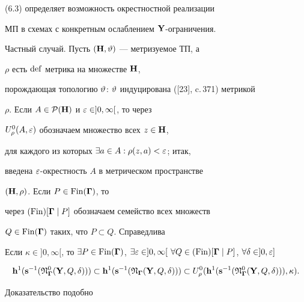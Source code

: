 (6.3) определяет возможность окрестностной реализации


МП в схемах с конкретным ослаблением ${\bold Y}$-ограничения.


\medskip





Частный случай. Пусть $({\bold H},\vartheta)$ --- метризуемое ТП, а


$\rho$ есть $\operatorname{def}$ метрика на множестве ${\bold H}$,


порождающая топологию $\vartheta$: $\vartheta$ индуцирована ([23], c.\,371) метрикой


$\rho$. Если $A \in {{\cal P}({\bold H})}$ и $\varepsilon \in ]0,\infty[$, то через


${U_\rho^0}(A,\varepsilon)$ обозначаем множество всех $z \in {\bold H}$,


для каждого из которых $\exists{a} \in A:{\rho}(z,a) < \varepsilon$; итак,


введена $\varepsilon$-окрестность $A$ в метрическом пространстве


$({\bold H},\rho)$. Если $P \in {\operatorname{Fin}}(\boldsymbol \Gamma)$, то


через $(\operatorname{Fin})[\boldsymbol \Gamma \mid P]$ обозначаем семейство всех множеств


$Q \in {\operatorname{Fin}}(\boldsymbol \Gamma)$ таких, что $P \subset Q$. Справедлива





\begin{thms}


Если $\kappa \in ]0,\infty[$, то $\exi{P} \in


{{\Fin}(\mG)}$, $\exi{\var} \in ]0,\infty[$ $\fo{Q} \in (\Fin)[\mG \mid


P]$, $\fo{\delta} \in ]0,\var]$


$$


{{\bold h}^1}({{\bold


s}^{-1}}({{\frak N}_{\mG}^0}({\bold Y},Q,\delta))) \subset {{\bold


h}^1}({{\bold s}^{-1}}({{\frak N}_{\mG}}({\bold Y},Q,\delta))) \subset


{U_{\rho}^0}({{\bold h}^1}({{\bold s}^{-1}}({{\frak N}_{\mG}^0}({\bold


Y},Q,\delta))),\kappa).


$$


\end{thms}





Доказательство подобно


